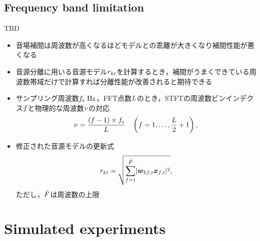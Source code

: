 \documentclass[twocolumn,9pt,dvipdfmx]{article}
\begin{document}
\subsection{Frequency band limitation}
TBD
\begin{itemize}
  \item 音場補間は周波数が高くなるほどモデルとの乖離が大きくなり補間性能が悪くなる \cite{Wakabayashi:2020:ASJ:A}
  \item 音源分離に用いる音源モデル$r _{kt}$を計算するとき，補間がうまくできている周波数帯域だけで計算すれば分離性能が改善されると期待できる
  \item サンプリング周波数$\freqSamp~\unit{\hertz}$，FFT点数$L$のとき，STFTの周波数ビンインデクス$f$と物理的な周波数$\nu$の対応
    \begin{equation}
      \nu = \frac{(f - 1)\times f _{\mathrm{s}}}{L} \quad \left(f = 1, \dots, \frac{L}{2} + 1\right),
    \end{equation}
  \item 修正された音源モデルの更新式
    \begin{equation}
      \var _{\src\tframe} = \sqrt{\sum _{\freq = 1} ^{\SubFreq} \lvert \demix _{\src\ft} \Obs _{\ft} \rvert ^2},
    \end{equation}
    ただし，$\tilde{F}$は周波数の上限
\end{itemize}

\section{Simulated experiments}
\end{document}
